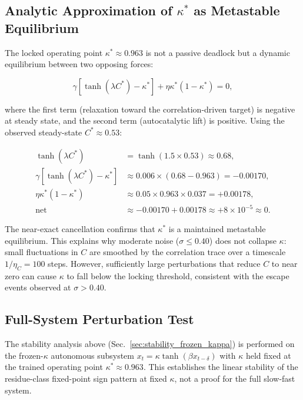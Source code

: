 \documentclass[12pt,a4paper]{article}
\begin{document}
\subsection{Analytic Approximation of $\kappa^*$ as Metastable Equilibrium}

\label{sec:kappa_equilibrium}



The locked operating point $\kappa^* \approx 0.963$ is not a passive deadlock but a dynamic equilibrium between two opposing forces:

\[

\gamma[\tanh(\lambda C^*) - \kappa^*] + \eta\kappa^*(1-\kappa^*) = 0,

\]

where the first term (relaxation toward the correlation-driven target) is negative at steady state, and the second term (autocatalytic lift) is positive. Using the observed steady-state $C^* \approx 0.53$:

\begin{align*}
\tanh(\lambda C^*) &= \tanh(1.5 \times 0.53) \approx 0.68,\\
\gamma[\tanh(\lambda C^*) - \kappa^*] &\approx 0.006 \times (0.68 - 0.963) = -0.00170,\\
\eta\kappa^*(1-\kappa^*) &\approx 0.05 \times 0.963 \times 0.037 = +0.00178,\\
\text{net} &\approx -0.00170 + 0.00178 \approx +8\times10^{-5} \approx 0.
\end{align*}

The near-exact cancellation confirms that $\kappa^*$ is a maintained metastable equilibrium. This explains why moderate noise ($\sigma \leq 0.40$) does not collapse $\kappa$: small fluctuations in $C$ are smoothed by the correlation trace over a timescale $1/\eta_C = 100$ steps. However, sufficiently large perturbations that reduce $C$ to near zero can cause $\kappa$ to fall below the locking threshold, consistent with the escape events observed at $\sigma > 0.40$.



\subsection{Full-System Perturbation Test}



The stability analysis above (Sec.~\ref{sec:stability_frozen_kappa}) is performed on the frozen-$\kappa$ autonomous subsystem $x_t = \kappa\tanh(\beta x_{t-\delta})$ with $\kappa$ held fixed at the trained operating point $\kappa^* \approx 0.963$. This establishes the linear stability of the residue-class fixed-point sign pattern at fixed $\kappa$, not a proof for the full slow-fast system.
\end{document}

